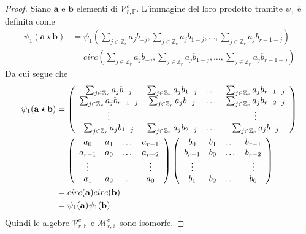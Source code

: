 \begin{proof}
Siano $\mathbf{a}$ e $\mathbf{b}$ elementi di
$\mathcal{V}_{r,\mathbb{F}}^{c}$. L'immagine del loro prodotto tramite
$\psi_{1}$ è definita come
\begin{align*}
\psi_{1}(\mathbf{a} \star \mathbf{b})
&= \psi_{1}(
\sum_{j \in \mathbb{Z}_{r} } a_{j} b_{-j},
\sum_{j \in \mathbb{Z}_{r} } a_{j} b_{1-j},
\dots ,
\sum_{j \in \mathbb{Z}_{r} } a_{j} b_{r-1-j}) \\
&=circ(
\sum_{j \in \mathbb{Z}_{r} } a_{j} b_{-j},
\sum_{j \in \mathbb{Z}_{r} } a_{j} b_{1-j},
\dots ,
\sum_{j \in \mathbb{Z}_{r} } a_{j} b_{r-1-j}
)
\end{align*}
Da cui segue che
\begin{align*}
\psi_{1}(\mathbf{a} \star \mathbf{b})
&=
\left(
\begin{array} {c c c c}
\sum_{j \in \mathbb{Z}_{r} } a_{j} b_{-j}
&
\sum_{j \in \mathbb{Z}_{r} } a_{j}b_{1-j}
&
\dots
&
\sum_{j \in \mathbb{Z}_{r} } a_{j} b_{r-1-j} \\
\sum_{j \in \mathbb{Z}_{r} } a_{j} b_{r-1-j}
&
\sum_{j \in \mathbb{Z}_{r} } a_{j} b_{-j}
&
\dots
&
\sum_{j \in \mathbb{Z}_{r} } a_{j} b_{r-2-j} \\
\vdots &  &  & \vdots   \\
\sum_{j \in \mathbb{Z}_{r} } a_{j} b_{1-j}
&
\sum_{j \in \mathbb{Z}_{r} } a_{j} b_{2-j}
&
\dots
&
\sum_{j \in\mathbb{Z}_{r} } a_{j} b_{-j}
\end{array}
\right)
\\
&=
\left(
\begin{array} {c c c c}
a_{0}
&
a_{1}
&
\dots
&
a_{r-1} \\
a_{r-1}
&
a_{0}
&
\dots
&
a_{r-2}  \\
\vdots &  &  & \vdots   \\
a_{1}
&
a_{2}
&
\dots
&
a_{0}
\end{array}
\right)
\left(
\begin{array} {c c c c}
b_{0}
&
b_{1}
&
\dots
&
b_{r-1} \\
b_{r-1}
&
b_{0}
&
\dots
&
b_{r-2}  \\
\vdots &  &  & \vdots   \\
b_{1}
&
b_{2}
&
\dots
&
b_{0}
\end{array}
\right)    \\
&= circ(\mathbf{a}) circ(\mathbf{b})
\\
&= \psi_{1}(\mathbf{a})\psi_{1}(\mathbf{b})
\end{align*}
Quindi le algebre $\mathcal{V}_{r, \mathbb{F}}^{c}$ e $\mathcal{M}_{r,\mathbb{F}
}^{c} $ sono isomorfe.

\end{proof}



